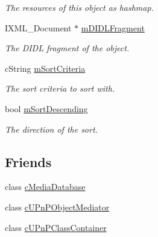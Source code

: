\begin{CompactItemize}
\begin{CompactList}\small\item\em The resources of this object as hashmap. \item\end{CompactList}\item 
\hypertarget{classcUPnPClassObject_21b48ab17d1d7379943aa9d4c026046a}{
IXML\_\-Document $\ast$ \hyperlink{classcUPnPClassObject_21b48ab17d1d7379943aa9d4c026046a}{mDIDLFragment}}
\label{classcUPnPClassObject_21b48ab17d1d7379943aa9d4c026046a}

\begin{CompactList}\small\item\em The DIDL fragment of the object. \item\end{CompactList}\item 
\hypertarget{classcUPnPClassObject_f7156d07778825170844d35fda5959eb}{
cString \hyperlink{classcUPnPClassObject_f7156d07778825170844d35fda5959eb}{mSortCriteria}}
\label{classcUPnPClassObject_f7156d07778825170844d35fda5959eb}

\begin{CompactList}\small\item\em The sort criteria to sort with. \item\end{CompactList}\item 
\hypertarget{classcUPnPClassObject_0bcc859a9bb114ebf93c474137bf157c}{
bool \hyperlink{classcUPnPClassObject_0bcc859a9bb114ebf93c474137bf157c}{mSortDescending}}
\label{classcUPnPClassObject_0bcc859a9bb114ebf93c474137bf157c}

\begin{CompactList}\small\item\em The direction of the sort. \item\end{CompactList}\end{CompactItemize}
\subsection*{Friends}
\begin{CompactItemize}
\item 
\hypertarget{classcUPnPClassObject_3d0d0aedce8b1c661ea360b9a6d616f6}{
class \hyperlink{classcUPnPClassObject_3d0d0aedce8b1c661ea360b9a6d616f6}{cMediaDatabase}}
\label{classcUPnPClassObject_3d0d0aedce8b1c661ea360b9a6d616f6}

\item 
\hypertarget{classcUPnPClassObject_aefab39434a832c545ac75a79fa81d23}{
class \hyperlink{classcUPnPClassObject_aefab39434a832c545ac75a79fa81d23}{cUPnPObjectMediator}}
\label{classcUPnPClassObject_aefab39434a832c545ac75a79fa81d23}

\item 
\hypertarget{classcUPnPClassObject_cb2ebde5758d6dc066be77d5a94d9f27}{
class \hyperlink{classcUPnPClassObject_cb2ebde5758d6dc066be77d5a94d9f27}{cUPnPClassContainer}}
\label{classcUPnPClassObject_cb2ebde5758d6dc066be77d5a94d9f27}

\end{CompactItemize}


